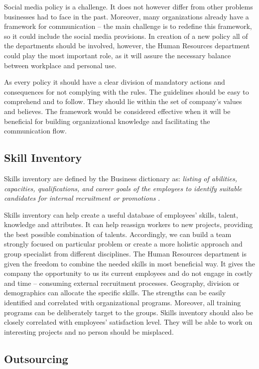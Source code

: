 \documentclass[a4paper,fleqn,11pt,dvips,titlepage]{article}
\numberwithin{figure}{section}
\numberwithin{equation}{section}
\begin{document}
Social media policy is a challenge.
It does not however differ from other problems businesses had to face in the past.
Moreover, many organizations already have a framework for communication – the main challenge is to redefine this framework,
so it could include the social media provisions.
In creation of a new policy all of the departments should be involved, however,
the Human Resources department could play the most important role, as it will assure the necessary balance between workplace and personal use. 

As every policy it should have a clear division of mandatory actions and consequences for not complying with the rules.
The guidelines should be easy to comprehend and to follow.
They should lie within the set of company’s values and believes.
The framework would be considered effective when it will be beneficial for building organizational knowledge and facilitating the communication flow. 

\subsection{Skill Inventory}

Skills inventory are defined by the Business dictionary as:
\emph{listing of abilities, capacities, qualifications, and career goals of the employees to identify suitable candidates for internal recruitment or promotions} \cite{BusinessDictionary}.

Skills inventory can help create a useful database of employees’ skills, talent, knowledge and attributes.
It can help reassign workers to new projects, providing the best possible combination of talents.
Accordingly, we can build a team strongly focused on particular problem or create a more holistic approach and group specialist from different disciplines.
The Human Resources department is given the freedom to combine the needed skills in most beneficial way.
It gives the company the opportunity to us its current employees and do not engage in costly and time – consuming external recruitment processes.
Geography, division or demographics can allocate the specific skills.
The strengths can be easily identified and correlated with organizational programs.
Moreover, all training programs can be deliberately target to the groups.
Skills inventory should also be closely correlated with employees’ satisfaction level.
They will be able to work on interesting projects and no person should be misplaced. 

\subsection{Outsourcing }
\end{document}
